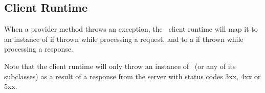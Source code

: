 \subsection{Client Runtime}
\label{exceptions_providers_client}

When a provider method throws an exception, the \jaxrs\ client runtime will map it to an instance of  if thrown while processing a request, and to a  if thrown while processing a response. 

Note that the client runtime will only throw an instance of \WebApplicationException\ (or any of its subclasses) as a result of a response from the server with status codes 3xx, 4xx or 5xx.

